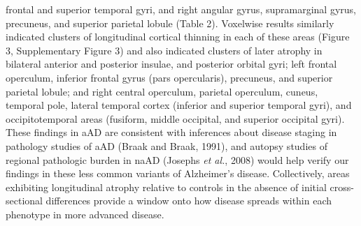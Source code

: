 \documentclass[]{article}
\begin{document}
frontal and superior temporal gyri, and right angular gyrus,
supramarginal gyrus, precuneus, and superior parietal lobule (Table 2).
Voxelwise results similarly indicated clusters of longitudinal cortical
thinning in each of these areas (Figure 3, Supplementary Figure 3) and
also indicated clusters of later atrophy in bilateral anterior and
posterior insulae, and posterior orbital gyri; left frontal operculum,
inferior frontal gyrus (pars opercularis), precuneus, and superior
parietal lobule; and right central operculum, parietal operculum,
cuneus, temporal pole, lateral temporal cortex (inferior and superior
temporal gyri), and occipitotemporal areas (fusiform, middle occipital,
and superior occipital gyri). These findings in aAD are consistent with
inferences about disease staging in pathology studies of aAD (Braak and
Braak, 1991), and autopsy studies of regional pathologic burden in naAD
(Josephs \emph{et al.}, 2008) would help verify our findings in these
less common variants of Alzheimer's disease. Collectively, areas
exhibiting longitudinal atrophy relative to controls in the absence of
initial cross-sectional differences provide a window onto how disease
spreads within each phenotype in more advanced disease.
\end{document}
